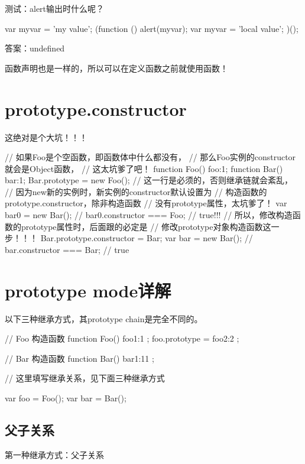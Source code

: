 \documentclass[a4paper,11pt]{article}
\begin{document}
测试：alert输出时什么呢？\\
\begin{javascriptcode}
  var myvar = 'my value';
  (function () {
    alert(myvar);
    var myvar = 'local value';
  })();
\end{javascriptcode}

答案：undefined

函数声明也是一样的，所以可以在定义函数之前就使用函数！

\section[prototype.constructor]{prototype.constructor}
这绝对是个大坑！！！\label{sec:inherit}

\begin{javascriptcode}
  // 如果Foo是个空函数，即函数体中什么都没有，
  // 那么Foo实例的constructor就会是Object函数，
  // 这太坑爹了吧！
  function Foo() {foo:1};
  function Bar() {bar:1};
  Bar.prototype = new Foo();
  // 这一行是必须的，否则继承链就会紊乱，
  // 因为new新的实例时，新实例的constructor默认设置为
  // 构造函数的prototype.constructor，除非构造函数
  // 没有prototype属性，太坑爹了！
  var bar0 = new Bar();
  // bar0.constructor === Foo; // true!!!
  // 所以，修改构造函数的prototype属性时，后面跟的必定是
  // 修改prototype对象构造函数这一步！！！
  Bar.prototype.constructor = Bar;
  var bar = new Bar();
  // bar.constructor === Bar; // true
  
\end{javascriptcode}

\section[prototype mode详解]{prototype mode详解}
以下三种继承方式，其prototype chain是完全不同的。

\begin{javascriptcode}
  // Foo 构造函数
  function Foo() { foo1:1 };
  foo.prototype = { foo2:2 };

  // Bar 构造函数
  function Bar() { bar1:11 };

  // 这里填写继承关系，见下面三种继承方式

  var foo = Foo();
  var bar = Bar();
\end{javascriptcode}

\subsection[父子关系]{父子关系}
第一种继承方式：父子关系
\end{document}
